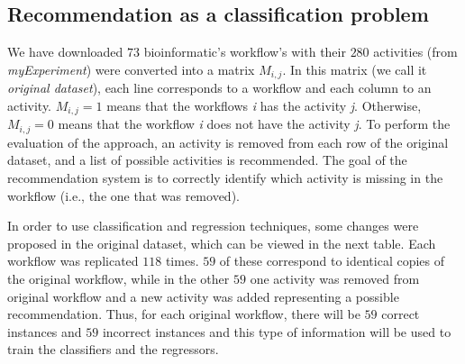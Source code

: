 \documentclass[ a0, portrait]{a0poster}
\begin{document}
\begin{multicols}{2}
\subsection*{Recommendation as a classification problem}
We have downloaded $73$ bioinformatic's workflow's with their $280$ activities (from \emph{myExperiment}) were converted into a matrix $M_{i, j}$. In this matrix (we call it \emph{original dataset}), each line corresponds to a workflow and each column to an activity. $M_{i, j} = 1$ means that the workflows \emph{i} has the activity \emph{j}. Otherwise, $M_{i, j} = 0$ means that the workflow \emph{i} does not have the activity \emph{j}. To perform the evaluation of the approach, an activity is removed from each row of the original dataset, and a list of possible activities is recommended. The goal of the recommendation system is to correctly identify which activity is missing in the workflow (i.e., the one that was removed).

In order to use classification and regression techniques, some changes were proposed in the original dataset, which can be viewed in the next table. Each workflow was replicated \(118\) times. \(59\) of these correspond to identical copies of the original workflow, while in the other \(59\) one activity was removed from original workflow and a new activity was added representing a possible recommendation. Thus, for each original workflow, there will be \(59\) correct instances and \(59\) incorrect instances and this type of information will be used to train the classifiers and the regressors.


\end{multicols}
\end{document}
